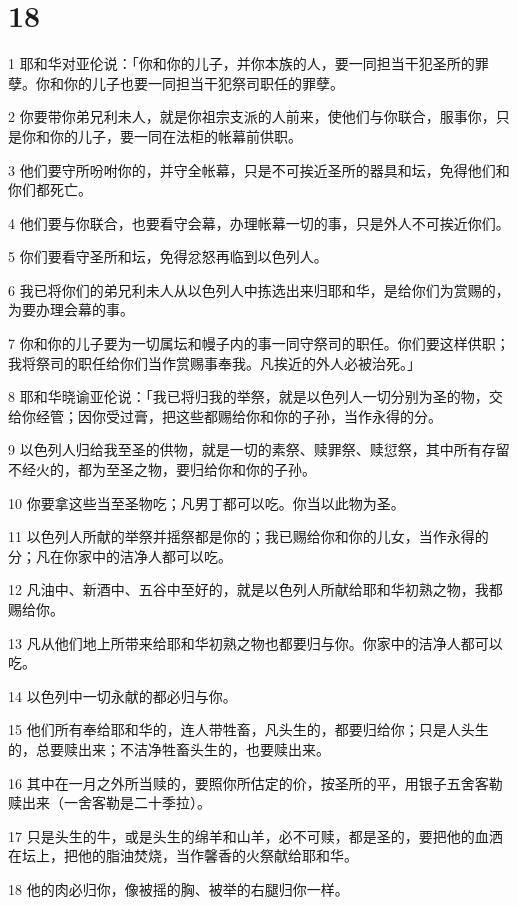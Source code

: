 \chapter{18}

\par 1 耶和华对亚伦说：「你和你的儿子，并你本族的人，要一同担当干犯圣所的罪孽。你和你的儿子也要一同担当干犯祭司职任的罪孽。
\par 2 你要带你弟兄利未人，就是你祖宗支派的人前来，使他们与你联合，服事你，只是你和你的儿子，要一同在法柜的帐幕前供职。
\par 3 他们要守所吩咐你的，并守全帐幕，只是不可挨近圣所的器具和坛，免得他们和你们都死亡。
\par 4 他们要与你联合，也要看守会幕，办理帐幕一切的事，只是外人不可挨近你们。
\par 5 你们要看守圣所和坛，免得忿怒再临到以色列人。
\par 6 我已将你们的弟兄利未人从以色列人中拣选出来归耶和华，是给你们为赏赐的，为要办理会幕的事。
\par 7 你和你的儿子要为一切属坛和幔子内的事一同守祭司的职任。你们要这样供职；我将祭司的职任给你们当作赏赐事奉我。凡挨近的外人必被治死。」
\par 8 耶和华晓谕亚伦说：「我已将归我的举祭，就是以色列人一切分别为圣的物，交给你经管；因你受过膏，把这些都赐给你和你的子孙，当作永得的分。
\par 9 以色列人归给我至圣的供物，就是一切的素祭、赎罪祭、赎愆祭，其中所有存留不经火的，都为至圣之物，要归给你和你的子孙。
\par 10 你要拿这些当至圣物吃；凡男丁都可以吃。你当以此物为圣。
\par 11 以色列人所献的举祭并摇祭都是你的；我已赐给你和你的儿女，当作永得的分；凡在你家中的洁净人都可以吃。
\par 12 凡油中、新酒中、五谷中至好的，就是以色列人所献给耶和华初熟之物，我都赐给你。
\par 13 凡从他们地上所带来给耶和华初熟之物也都要归与你。你家中的洁净人都可以吃。
\par 14 以色列中一切永献的都必归与你。
\par 15 他们所有奉给耶和华的，连人带牲畜，凡头生的，都要归给你；只是人头生的，总要赎出来；不洁净牲畜头生的，也要赎出来。
\par 16 其中在一月之外所当赎的，要照你所估定的价，按圣所的平，用银子五舍客勒赎出来（一舍客勒是二十季拉）。
\par 17 只是头生的牛，或是头生的绵羊和山羊，必不可赎，都是圣的，要把他的血洒在坛上，把他的脂油焚烧，当作馨香的火祭献给耶和华。
\par 18 他的肉必归你，像被摇的胸、被举的右腿归你一样。
